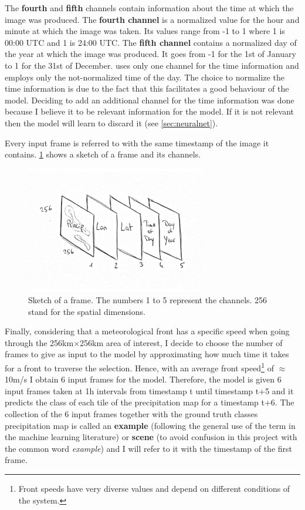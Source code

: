 The \textbf{fourth} and \textbf{fifth} channels contain information about the time at which the image was produced. The \textbf{fourth channel} is a normalized value for the hour and minute at which the image was taken. Its values range from -1 to 1 where 1 is 00:00 UTC and 1 is 24:00 UTC. The \textbf{fifth channel} contains a normalized day of the year at which the image was produced. It goes from -1 for the 1st of January to 1 for the 31st of December. \citet{Agrawal2019MachineImages} uses only one channel for the time information and employs only the not-normalized time of the day. The choice to normalize the time information is due to the fact that this facilitates a good behaviour of the model. Deciding to add an additional channel for the time information was done because I believe it to be relevant information for the model. If it is not relevant then the model will learn to discard it (see \cref{sec:neuralnet}).

Every input frame is referred to with the same timestamp of the image it contains. \cref{fig:radnetframe} shows a sketch of a frame and its channels.

\begin{figure}[h!]
    \centering
    \includegraphics[width=0.7\textwidth]{Frame.pdf}
    \caption{Sketch of a frame. The numbers 1 to 5 represent the channels. 256 stand for the spatial dimensions.}
    \label{fig:radnetframe}
\end{figure}


Finally, considering that a meteorological front has a specific speed when going through the 256km$\times$256km area of interest, I decide to choose the number of frames to give as input to the model by approximating how much time it takes for a front to traverse the selection. Hence, with an average front speed\footnote{Front speeds have very diverse values and depend on different conditions of the system.} of $\approx$10m/s I obtain 6 input frames for the model. Therefore, the model is given 6 input frames taken at 1h intervals from timestamp t until timestamp t+5 and it predicts the class of each tile of the precipitation map for a timestamp t+6. The collection of the 6 input frames together with the ground truth classes precipitation map is called an \textbf{example} (following the general use of the term in the machine learning literature) or \textbf{scene} (to avoid confusion in this project with the common word \textit{example}) and I will refer to it with the timestamp of the first frame. 

